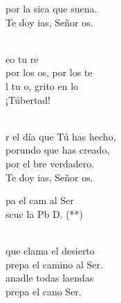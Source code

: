 \documentclass[12pt]{article}
\begin{document}
\begin{multicols*}{2}
\begin{cancion}
	por la sica que suena.\\
	Te doy ias, Señor os.\\\jump\\
	\begin{chorus}%
	eo tu re\\
	por los os, por los te  \\
	l tu o, grito en lo \\
	¡Túbertad! \\
	\end{chorus}%
	\jump\\
	r el día que Tú has hecho, \\
	porundo que has creado, \\
	por el bre verdadero.\\
	Te doy ias, Señor os.\\
\end{cancion}%

\begin{cancion}%
	\begin{chorus}%
	pa el cam al Ser\\
	scuc la Pb  D. (**)\\
	\end{chorus}%
	\jump\\
	 que clama el desierto\\
	prepa el camino al Ser.\\
	anadle todas laendas\\
	prepa el cano  Ser.\\
\end{cancion}%


\end{multicols*}
\end{document}
